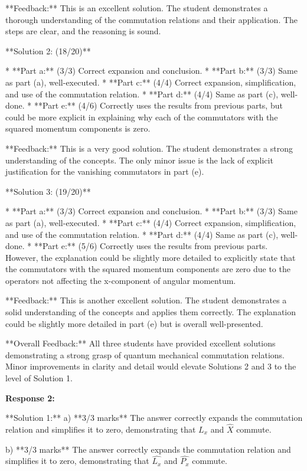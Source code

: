 \documentclass[a4paper,11pt]{article}
\begin{document}
**Feedback:** This is an excellent solution. The student demonstrates a thorough understanding of the commutation relations and their application. The steps are clear, and the reasoning is sound.

**Solution 2: (18/20)**

*   **Part a:** (3/3) Correct expansion and conclusion.
*   **Part b:** (3/3) Same as part (a), well-executed.
*   **Part c:** (4/4) Correct expansion, simplification, and use of the commutation relation.
*   **Part d:** (4/4) Same as part (c), well-done.
*   **Part e:** (4/6) Correctly uses the results from previous parts, but could be more explicit in explaining why each of the commutators with the squared momentum components is zero.

**Feedback:** This is a very good solution. The student demonstrates a strong understanding of the concepts. The only minor issue is the lack of explicit justification for the vanishing commutators in part (e).

**Solution 3: (19/20)**

*   **Part a:** (3/3) Correct expansion and conclusion.
*   **Part b:** (3/3) Same as part (a), well-executed.
*   **Part c:** (4/4) Correct expansion, simplification, and use of the commutation relation.
*   **Part d:** (4/4) Same as part (c), well-done.
*   **Part e:** (5/6) Correctly uses the results from previous parts. However, the explanation could be slightly more detailed to explicitly state that the commutators with the squared momentum components are zero due to the operators not affecting the x-component of angular momentum.

**Feedback:** This is another excellent solution. The student demonstrates a solid understanding of the concepts and applies them correctly. The explanation could be slightly more detailed in part (e) but is overall well-presented.

**Overall Feedback:** All three students have provided excellent solutions demonstrating a strong grasp of quantum mechanical commutation relations. Minor improvements in clarity and detail would elevate Solutions 2 and 3 to the level of Solution 1. 

\textbf{Response 2:}

**Solution 1:**
a) **3/3 marks**
The answer correctly expands the commutation relation and simplifies it to zero, demonstrating that \(\hat{L_x}\) and \(\hat{X}\) commute.

b) **3/3 marks**
The answer correctly expands the commutation relation and simplifies it to zero, demonstrating that \(\hat{L_x}\) and \(\hat{P_x}\) commute.
\end{document}
